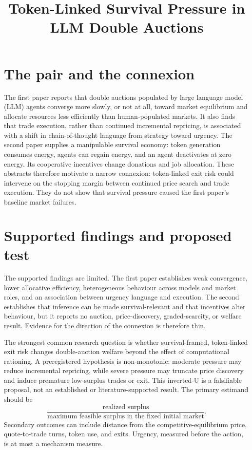 \documentclass{article}
\title{Token-Linked Survival Pressure in LLM Double Auctions}
\begin{document}
\maketitle

\section{The pair and the connexion}

The first paper reports that double auctions populated by large language model (LLM) agents converge more slowly, or not at all, toward market equilibrium and allocate resources less efficiently than human-populated markets. It also finds that trade execution, rather than continued incremental repricing, is associated with a shift in chain-of-thought language from strategy toward urgency. The second paper supplies a manipulable survival economy: token generation consumes energy, agents can regain energy, and an agent deactivates at zero energy. Its cooperative incentives change donations and job allocation. These abstracts therefore motivate a narrow connexion: token-linked exit risk could intervene on the stopping margin between continued price search and trade execution. They do not show that survival pressure caused the first paper's baseline market failures. 

\section{Supported findings and proposed test}

The supported findings are limited. The first paper establishes weak convergence, lower allocative efficiency, heterogeneous behaviour across models and market roles, and an association between urgency language and execution. The second establishes that inference can be made survival-relevant and that incentives alter behaviour, but it reports no auction, price-discovery, graded-scarcity, or welfare result. Evidence for the direction of the connexion is therefore thin. 

The strongest common research question is whether survival-framed, token-linked exit risk changes double-auction welfare beyond the effect of computational rationing. A preregistered hypothesis is non-monotonic: moderate pressure may reduce incremental repricing, while severe pressure may truncate price discovery and induce premature low-surplus trades or exit. This inverted-U is a falsifiable proposal, not an established or literature-supported result. The primary estimand should be
\[
  \frac{\text{realized surplus}}{\text{maximum feasible surplus in the fixed initial market}}.
\]
Secondary outcomes can include distance from the competitive-equilibrium price, quote-to-trade turns, token use, and exits. Urgency, measured before the action, is at most a mechanism measure. 
\end{document}
